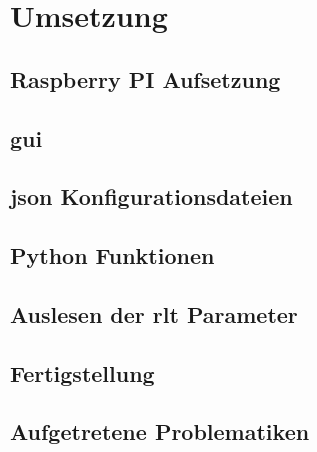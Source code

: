 \chapter{Umsetzung} 

\section{Raspberry PI Aufsetzung}
\setAuthor{\pezze}


\section{\acf{gui}}\label{gui_design}
\setAuthor{\pezze}



\section{\acs{json} Konfigurationsdateien}
\setAuthor{\pezze}



\setAuthor{\schneider}


\section{Python Funktionen}
\setAuthor{\pezze}


\section{Auslesen der \acs{rlt} Parameter}
\setAuthor{\schneider}


\section{Fertigstellung}
\setAuthor{\schneider}


\setAuthor{\pezze}



\newpage
\section{Aufgetretene Problematiken}
\setAuthor{\mangeng}

